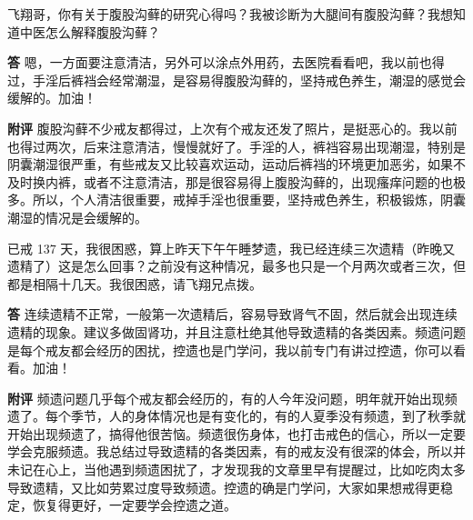 \begin{case}
    飞翔哥，你有关于腹股沟藓的研究心得吗？我被诊断为大腿间有腹股沟藓？我想知道中医怎么解释腹股沟藓？

    \textbf{答} 嗯，一方面要注意清洁，另外可以涂点外用药，去医院看看吧，我以前也得过，手淫后裤裆会经常潮湿，是容易得腹股沟藓的，坚持戒色养生，潮湿的感觉会缓解的。加油！

    \textbf{附评} 腹股沟藓不少戒友都得过，上次有个戒友还发了照片，是挺恶心的。我以前也得过两次，后来注意清洁，慢慢就好了。手淫的人，裤裆容易出现潮湿，特别是阴囊潮湿很严重，有些戒友又比较喜欢运动，运动后裤裆的环境更加恶劣，如果不及时换内裤，或者不注意清洁，那是很容易得上腹股沟藓的，出现瘙痒问题的也极多。所以，个人清洁很重要，戒掉手淫也很重要，坚持戒色养生，积极锻炼，阴囊潮湿的情况是会缓解的。
\end{case}

\begin{case}
    已戒 137 天，我很困惑，算上昨天下午午睡梦遗，我已经连续三次遗精（昨晚又遗精了）这是怎么回事？之前没有这种情况，最多也只是一个月两次或者三次，但都是相隔十几天。我很困惑，请飞翔兄点拨。

    \textbf{答} 连续遗精不正常，一般第一次遗精后，容易导致肾气不固，然后就会出现连续遗精的现象。建议多做固肾功，并且注意杜绝其他导致遗精的各类因素。频遗问题是每个戒友都会经历的困扰，控遗也是门学问，我以前专门有讲过控遗，你可以看看。加油！

    \textbf{附评} 频遗问题几乎每个戒友都会经历的，有的人今年没问题，明年就开始出现频遗了。每个季节，人的身体情况也是有变化的，有的人夏季没有频遗，到了秋季就开始出现频遗了，搞得他很苦恼。频遗很伤身体，也打击戒色的信心，所以一定要学会克服频遗。我总结过导致遗精的各类因素，有的戒友没有很深的体会，所以并未记在心上，当他遇到频遗困扰了，才发现我的文章里早有提醒过，比如吃肉太多导致遗精，又比如劳累过度导致频遗。控遗的确是门学问，大家如果想戒得更稳定，恢复得更好，一定要学会控遗之道。
\end{case}

